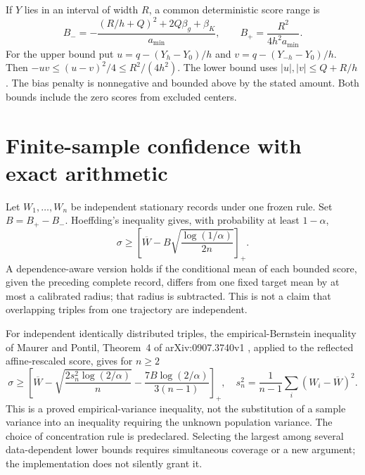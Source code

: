 If $Y$ lies in an interval of width $R$, a common deterministic score range is
\begin{equation}
 B_-=-\frac{(R/h+Q)^2+2Q\beta_g+\beta_K}{a_{\min}},
 \qquad B_+=\frac{R^2}{4h^2a_{\min}}.
 \label{eq:og-finite-range}
\end{equation}
For the upper bound put $u=q-(Y_h-Y_0)/h$ and
$v=q-(Y_{-h}-Y_0)/h$. Then
$-uv\le(u-v)^2/4\le R^2/(4h^2)$. The lower bound uses
$|u|,|v|\le Q+R/h$. The bias penalty is nonnegative and bounded above by the
stated amount. Both bounds include the zero scores from excluded centers.

\section{Finite-sample confidence with exact arithmetic}
Let $W_1,\ldots,W_n$ be independent stationary records under one frozen rule.
Set $B=B_+-B_-$. Hoeffding's inequality gives, with probability at least
$1-\alpha$,
\begin{equation}
 \sigma\ge\left[\overline W-
 B\sqrt{\frac{\log(1/\alpha)}{2n}}\right]_+.
 \label{eq:og-finite-hoeffding}
\end{equation}
A dependence-aware version holds if the conditional mean of each bounded
score, given the preceding complete record, differs from one fixed target
mean by at most a calibrated radius; that radius is subtracted. This is not a
claim that overlapping triples from one trajectory are independent.

For independent identically distributed triples, the empirical-Bernstein
inequality of Maurer and Pontil, Theorem~4 of arXiv:0907.3740v1
\cite{ogMaurer2009}, applied to the
reflected affine-rescaled score, gives for $n\ge2$
\begin{equation}
 \sigma\ge\left[\overline W-
 \sqrt{\frac{2s_n^2\log(2/\alpha)}{n}}
 -\frac{7B\log(2/\alpha)}{3(n-1)}\right]_+,
 \quad s_n^2=\frac1{n-1}\sum_i(W_i-\overline W)^2.
 \label{eq:og-finite-empirical}
\end{equation}
This is a proved empirical-variance inequality, not the substitution of a
sample variance into an inequality requiring the unknown population variance.
The choice of concentration rule is predeclared. Selecting the largest among
several data-dependent lower bounds requires simultaneous coverage or a new
argument; the implementation does not silently grant it.

